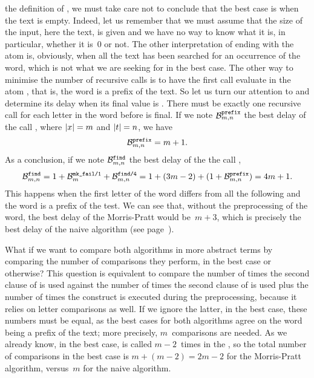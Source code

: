 the definition of , we must take care not to conclude
that the best case is when the text is empty. Indeed, let us remember
that we must assume that the size of the input, here the text, is
given and we have no way to know what it is, in particular, whether it
is~\(0\) or not. The other interpretation of ending with the atom
 is, obviously, when all the text has been searched
for an occurrence of the word, which is not what we are seeking for in
the best case. The other way to minimise the number of recursive calls
is to have the first call  evaluate in the atom
, that is, the word is a prefix of the text. So let us
turn our attention to  and determine its delay when
its final value is . There must be exactly one recursive
call for each letter in the word before  is final. If we
note \(\best{prefix}{m,n}\) the best delay of the call
, where \({\len{x}=m}\) and
\({\len{t}=n}\), we have
\[
\best{prefix}{m,n} = m + 1.
\]
As a conclusion, if we note \(\best{find}{m,n}\) the best delay of the
the call ,
\[
\best{find}{m,n} = 1 + \best{mk\_fail/1}{m} + \best{find/4}{m,n}
                 = 1 + (3m-2) + (1 + \best{prefix}{m,n})
                 = 4m + 1.
\]
This happens when the first letter of the word differs from all the
following and the word is a prefix of the test. We can see that,
without the preprocessing of the word, the best delay of the
Morris\hyp{}Pratt would be~\({m+3}\), which is precisely the best
delay of the naive algorithm (see page~\pageref{naive_best}).

What if we want to compare both algorithms in more abstract terms by
comparing the number of comparisons they perform, in the best case or
otherwise?  This question is equivalent to compare the number of times
the second clause of  is used against the number of
times the second clause of  is used plus the number
of times the  construct is executed during the
preprocessing, because it relies on letter comparisons as well. If we
ignore the latter, in the best case, these numbers must be equal, as
the best cases for both algorithms agree on the word being a prefix of
the text; more precisely, \(m\)~comparisons are needed. As we already
know, in the best case,  is called \(m-2\)~times in the
, so the total number of comparisons in the best case is
\(m+(m-2)=2m-2\) for the Morris\hyp{}Pratt algorithm, versus~\(m\) for
the naive algorithm.

